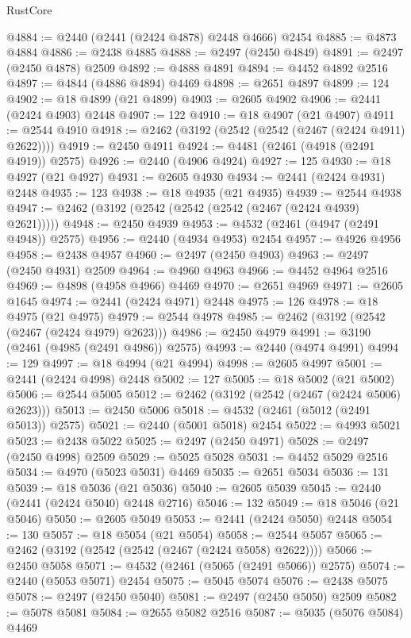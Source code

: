 \begin{lexlean}{RustCore}
\begin{coremodule}
@4884 := @2440 (@2441 (@2424 @4878) @2448 @4666) @2454
@4885 := @4873 @4884
@4886 := @2438 @4885
@4888 := @2497 (@2450 @4849)
@4891 := @2497 (@2450 @4878) @2509
@4892 := @4888 @4891
@4894 := @4452 @4892 @2516
@4897 := @4844 (@4886 @4894) @4469
@4898 := @2651 @4897
@4899 := 124
@4902 := @18 @4899 (@21 @4899)
@4903 := @2605 @4902
@4906 := @2441 (@2424 @4903) @2448
@4907 := 122
@4910 := @18 @4907 (@21 @4907)
@4911 := @2544 @4910
@4918 := @2462 (@3192 (@2542 (@2542 (@2467 (@2424 @4911) @2622))))
@4919 := @2450 @4911
@4924 := @4481 (@2461 (@4918 (@2491 @4919)) @2575)
@4926 := @2440 (@4906 @4924)
@4927 := 125
@4930 := @18 @4927 (@21 @4927)
@4931 := @2605 @4930
@4934 := @2441 (@2424 @4931) @2448
@4935 := 123
@4938 := @18 @4935 (@21 @4935)
@4939 := @2544 @4938
@4947 := @2462 (@3192 (@2542 (@2542 (@2542 (@2467 (@2424 @4939) @2621)))))
@4948 := @2450 @4939
@4953 := @4532 (@2461 (@4947 (@2491 @4948)) @2575)
@4956 := @2440 (@4934 @4953) @2454
@4957 := @4926 @4956
@4958 := @2438 @4957
@4960 := @2497 (@2450 @4903)
@4963 := @2497 (@2450 @4931) @2509
@4964 := @4960 @4963
@4966 := @4452 @4964 @2516
@4969 := @4898 (@4958 @4966) @4469
@4970 := @2651 @4969
@4971 := @2605 @1645
@4974 := @2441 (@2424 @4971) @2448
@4975 := 126
@4978 := @18 @4975 (@21 @4975)
@4979 := @2544 @4978
@4985 := @2462 (@3192 (@2542 (@2467 (@2424 @4979) @2623)))
@4986 := @2450 @4979
@4991 := @3190 (@2461 (@4985 (@2491 @4986)) @2575)
@4993 := @2440 (@4974 @4991)
@4994 := 129
@4997 := @18 @4994 (@21 @4994)
@4998 := @2605 @4997
@5001 := @2441 (@2424 @4998) @2448
@5002 := 127
@5005 := @18 @5002 (@21 @5002)
@5006 := @2544 @5005
@5012 := @2462 (@3192 (@2542 (@2467 (@2424 @5006) @2623)))
@5013 := @2450 @5006
@5018 := @4532 (@2461 (@5012 (@2491 @5013)) @2575)
@5021 := @2440 (@5001 @5018) @2454
@5022 := @4993 @5021
@5023 := @2438 @5022
@5025 := @2497 (@2450 @4971)
@5028 := @2497 (@2450 @4998) @2509
@5029 := @5025 @5028
@5031 := @4452 @5029 @2516
@5034 := @4970 (@5023 @5031) @4469
@5035 := @2651 @5034
@5036 := 131
@5039 := @18 @5036 (@21 @5036)
@5040 := @2605 @5039
@5045 := @2440 (@2441 (@2424 @5040) @2448 @2716)
@5046 := 132
@5049 := @18 @5046 (@21 @5046)
@5050 := @2605 @5049
@5053 := @2441 (@2424 @5050) @2448
@5054 := 130
@5057 := @18 @5054 (@21 @5054)
@5058 := @2544 @5057
@5065 := @2462 (@3192 (@2542 (@2542 (@2467 (@2424 @5058) @2622))))
@5066 := @2450 @5058
@5071 := @4532 (@2461 (@5065 (@2491 @5066)) @2575)
@5074 := @2440 (@5053 @5071) @2454
@5075 := @5045 @5074
@5076 := @2438 @5075
@5078 := @2497 (@2450 @5040)
@5081 := @2497 (@2450 @5050) @2509
@5082 := @5078 @5081
@5084 := @2655 @5082 @2516
@5087 := @5035 (@5076 @5084) @4469

\end{coremodule}
\end{lexlean}
